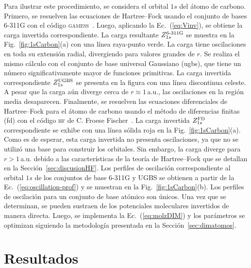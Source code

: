 Para ilustrar este procedimiento, se considera el orbital $1s$ del átomo 
de carbono. Primero, se resuelven las ecuaciones de Hartree--Fock usando 
el conjunto de bases \mbox{6-311G} con el código 
\textsc{gamess}~\cite{Schmidt:93,Gordon:05}. Luego, aplicando la 
Ec.~(\ref{eq:Vinv}), se obtiene la carga invertida correspondiente. La 
carga resultante $Z_{1s}^{\mbox{\scriptsize 6-311G}}$ se muestra en la 
Fig.~\ref{fig:1sCarbon}(a) con una línea raya-punto verde. La carga 
tiene oscilaciones en toda su extensión radial, divergiendo para valores 
grandes de $r$. Se realiza el mismo cálculo con el conjunto de base 
universal Gaussiano (\acs{ugbs}), que tiene un número significativamente 
mayor de funciones primitivas. La carga invertida correspondiente 
$Z_{1s}^{\mbox{\scriptsize UGBS}}$ se presenta en la figura con una 
línea discontinua celeste. A pesar que la carga aún diverge cerca de 
$r\approx1\,$a.u., las oscilaciones en la región media desaparecen. 
Finalmente, se resuelven las ecuaciones diferenciales de Hartree--Fock 
para el átomo de carbono usando el método de diferencias finitas 
(\acs{fd}) con el código \textsc{hf} de C. Froese 
Fischer~\cite{FroeseFischer:97}. La carga invertida 
$Z_{1s}^{\mbox{\scriptsize FD}}$ correspondiente se exhibe con una línea 
sólida roja en la Fig.~\ref{fig:1sCarbon}(a). Como es de esperar, esta 
carga invertida no presenta oscilaciones, ya que no se utilizó una base 
para construir los orbitales. Sin embargo, la carga diverge para 
$r>1\,$a.u. debido a las características de la teoría de Hartree--Fock 
que se detallan en la Sección~\ref{sec:discusionHF}. Los perfiles de 
oscilación correspondiente al orbital $1s$ de los conjuntos de 
base \mbox{6-311G} y UGBS se obtienen a partir de la 
Ec.~(\ref{eq:oscillation-prof}) y se muestran en la 
Fig.~\ref{fig:1sCarbon}(b). Los perfiles de oscilación para un conjunto 
de base atómico son únicos. Una vez que se determinan, se pueden 
sustraen de los potenciales moleculares invertidos de manera directa. 
Luego, se implementa la Ec.~(\ref{eq:molzDIM}) y los parámetros 
se optimizan siguiendo la metodología presentada en la 
Sección~\ref{sec:dimatomos}.

\section{Resultados}
\label{sec:dimresultados}

